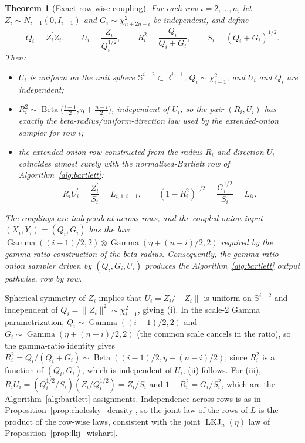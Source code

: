 \documentclass[12pt,english]{article}
\makeatletter
\theoremstyle{plain} %
\newtheorem{theorem}{Theorem}
\theoremstyle{definition} %
\theoremstyle{remark} %
\renewenvironment{proof}[1][\proofname]{\par
  \pushQED{\qed}%
  \normalfont \topsep6\p@\@plus6\p@\relax
  \trivlist
  \item[\hskip\labelsep\bfseries#1:]\ignorespaces
}{%
  \popQED\endtrivlist\@endpefalse
}
\makeatother
\begin{document}
\begin{theorem}[Exact row-wise coupling]
\label{thm:coupling}
For each row $i=2,\ldots,n$, let $Z_i\sim N_{i-1}(0,I_{i-1})$ and $G_i\sim\chi^2_{n+2\eta-i}$ be independent, and define
$$
Q_i=Z_i^\prime Z_i,\qquad
U_i=\frac{Z_i}{Q_i^{1/2}},\qquad
R_i^2=\frac{Q_i}{Q_i+G_i},\qquad
S_i=(Q_i+G_i)^{1/2}.
$$
Then:
\begin{itemize}
\item[(i)] $U_i$ is uniform on the unit sphere $\mathbb{S}^{i-2}\subset\mathbb{R}^{i-1}$, $Q_i\sim\chi^2_{i-1}$, and $U_i$ and $Q_i$ are independent;
\item[(ii)] $R_i^2\sim\operatorname{Beta}\bigl(\frac{i-1}{2},\eta+\frac{n-i}{2}\bigr)$, independent of $U_i$, so the pair $(R_i,U_i)$ has exactly the beta-radius/uniform-direction law used by the extended-onion sampler for row $i$;
\item[(iii)] the extended-onion row constructed from the radius $R_i$ and direction $U_i$ coincides \emph{almost surely} with the normalized-Bartlett row of Algorithm~\ref{alg:bartlett}:
$$
R_iU_i^\prime=\frac{Z_i^\prime}{S_i}=L_{i,1:i-1},
\qquad
(1-R_i^2)^{1/2}=\frac{G_i^{1/2}}{S_i}=L_{ii}.
$$
\end{itemize}
The couplings are independent across rows, and the coupled onion input $(X_i,Y_i)=(Q_i,G_i)$ has the law $\operatorname{Gamma}((i-1)/2,2)\otimes\operatorname{Gamma}(\eta+(n-i)/2,2)$ required by the gamma-ratio construction of the beta radius. Consequently, the gamma-ratio onion sampler driven by $(Q_i,G_i,U_i)$ produces the Algorithm~\ref{alg:bartlett} output pathwise, row by row.
\end{theorem}

\begin{proof}
Spherical symmetry of $Z_i$ implies that $U_i=Z_i/\|Z_i\|$ is uniform on $\mathbb{S}^{i-2}$ and independent of $Q_i=\|Z_i\|^2\sim\chi^2_{i-1}$, giving (i). In the scale-2 Gamma parametrization, $Q_i\sim\operatorname{Gamma}((i-1)/2,2)$ and $G_i\sim\operatorname{Gamma}(\eta+(n-i)/2,2)$ (the common scale cancels in the ratio), so the gamma-ratio identity gives $R_i^2=Q_i/(Q_i+G_i)\sim\operatorname{Beta}((i-1)/2,\eta+(n-i)/2)$; since $R_i^2$ is a function of $(Q_i,G_i)$, which is independent of $U_i$, (ii) follows. For (iii), $R_iU_i=(Q_i^{1/2}/S_i) (Z_i/Q_i^{1/2})=Z_i/S_i$ and $1-R_i^2=G_i/S_i^2$, which are the Algorithm~\ref{alg:bartlett} assignments. Independence across rows is as in Proposition~\ref{prop:cholesky_density}, so the joint law of the rows of $L$ is the product of the row-wise laws, consistent with the joint $\operatorname{LKJ}_n(\eta)$ law of Proposition~\ref{prop:lkj_wishart}.
\end{proof}
\end{document}
